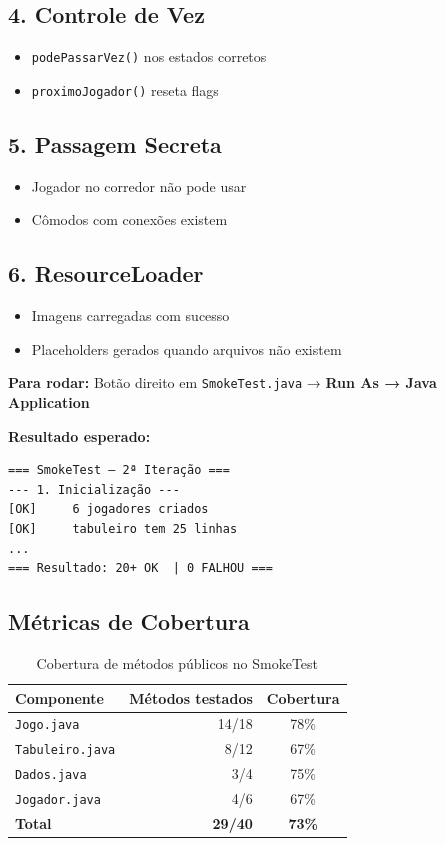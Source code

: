 \documentclass[12pt,a4paper]{report}
\begin{document}
\subsection{4. Controle de Vez}
\begin{itemize}
    \item \texttt{podePassarVez()} nos estados corretos
    \item \texttt{proximoJogador()} reseta flags
\end{itemize}

\subsection{5. Passagem Secreta}
\begin{itemize}
    \item Jogador no corredor não pode usar
    \item Cômodos com conexões existem
\end{itemize}

\subsection{6. ResourceLoader}
\begin{itemize}
    \item Imagens carregadas com sucesso
    \item Placeholders gerados quando arquivos não existem
\end{itemize}

\textbf{Para rodar:} Botão direito em \texttt{SmokeTest.java} → \textbf{Run As → Java Application}

\textbf{Resultado esperado:}
\begin{lstlisting}
=== SmokeTest — 2ª Iteração ===
--- 1. Inicialização ---
[OK]     6 jogadores criados
[OK]     tabuleiro tem 25 linhas
...
=== Resultado: 20+ OK  | 0 FALHOU ===
\end{lstlisting}

\subsection{Métricas de Cobertura}

\begin{table}[H]
\centering
\begin{tabular}{|l|r|c|}
\hline
\textbf{Componente} & \textbf{Métodos testados} & \textbf{Cobertura} \\
\hline
\texttt{Jogo.java} & 14/18 & 78\% \\
\hline
\texttt{Tabuleiro.java} & 8/12 & 67\% \\
\hline
\texttt{Dados.java} & 3/4 & 75\% \\
\hline
\texttt{Jogador.java} & 4/6 & 67\% \\
\hline
\textbf{Total} & \textbf{29/40} & \textbf{73\%} \\
\hline
\end{tabular}
\caption{Cobertura de métodos públicos no SmokeTest}
\end{table}
\end{document}
